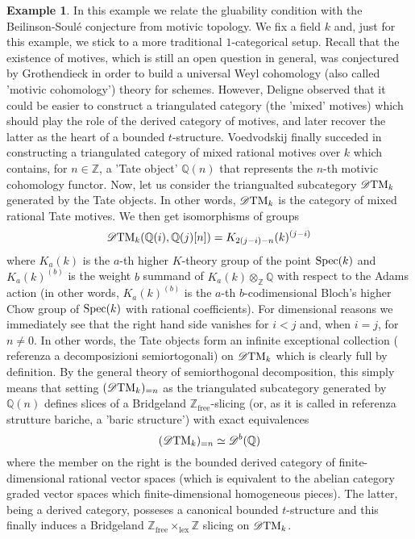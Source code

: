 \documentclass{article}
\theoremstyle{definition}
\newtheorem{exmp}[thm]{Example}
\newcommand{\Z}{\mathbb{Z}}
\begin{document}
\begin{exmp}
  In this example we relate the gluability condition with the Beilinson-Soul\'e conjecture from motivic topology. We fix a field $k$ and, just for this example, we stick to a more traditional $1$-categorical setup. Recall that the existence of motives, which is still an open question in general, was conjectured by Grothendieck in order to build a universal Weyl cohomology (also called 'motivic cohomology') theory for schemes. However, Deligne observed that it could be easier to construct a triangulated category (the 'mixed' motives) which should play the role of the derived category of motives, and later recover the latter as the heart of a bounded $t$-structure. Voedvodskij finally succeded in constructing a triangulated category of mixed rational motives over $k$ which contains, for $n \in \Z$, a 'Tate object' $\mathbb{Q}(n)$ that represents the $n$-th motivic cohomology functor. Now, let us consider the triangualted subcategory $\mathscr{D}\textnormal{TM}_k$ generated by the Tate objects. In other words, $\mathscr{D}\textnormal{TM}_k$ is the category of mixed rational Tate motives. We then get isomorphisms of groups
  \[
   \mathscr{D}\textnormal{TM}_k(\mathbb{Q}(i),\mathbb{Q}(j)[n])=K_{2(j-i)-n}(k)^{(j-i)}
   \]
   where $K_a(k)$ is the $a$-th higher $K$-theory group of the point $\textnormal{Spec}(k)$ and $K_a(k)^{(b)}$ is the weight $b$ summand of $K_a(k) \otimes_{\mathbb{Z}} \mathbb{Q}$ with respect to the Adams action (in other words, $K_a(k)^{(b)}$ is the $a$-th $b$-codimensional Bloch's higher Chow group of $\textnormal{Spec}(k)$ with rational coefficients). For dimensional reasons we immediately see that the right hand side vanishes for $i < j$ and, when $i = j$, for $n \neq 0$. In other words, the Tate objects form an infinite exceptional collection ({\color{red} referenza a decomposizioni semiortogonali}) on $\mathscr{D}\textnormal{TM}_k$ which is clearly full by definition. By the general theory of semiorthogonal decomposition, this simply means that setting $(\mathscr{D}\textnormal{TM}_k)_{=n}$ as the triangulated subcategory generated by $\mathbb{Q}(n)$ defines slices of a Bridgeland $\Z_{\mathrm{free}}$-slicing (or, as it is called in {\color{red} referenza strutture bariche}, a 'baric structure') with exact equivalences
   \[
   (\mathscr{D}\textnormal{TM}_k)_{=n} \simeq \mathscr{D}^b(\mathbb{Q})
   \]
   where the member on the right is the bounded derived category of finite-dimensional rational vector spaces (which is equivalent to the abelian category graded vector spaces which finite-dimensional homogeneous pieces). The latter, being a derived category, posseses a canonical bounded $t$-structure and this finally induces a Bridgeland $\Z_{\mathrm{free}} \times_{\mathrm{lex}} \Z$ slicing on $\mathscr{D}\textnormal{TM}_k$. \\

\end{exmp}
\end{document}
